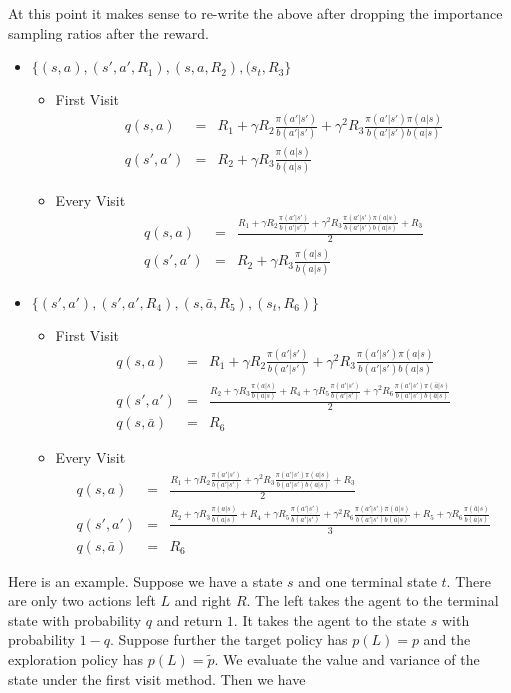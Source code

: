 \documentclass[11pt,a4paper]{article}
\newcommand\bea{\begin{eqnarray}}
\newcommand\eea{\end{eqnarray}}
\begin{document}
At this point it makes sense to re-write the above after dropping the importance sampling ratios after the reward.
 
\begin{itemize}
\item $\{(s,a),(s',a',R_1),(s,a,R_2),(s_t,R_3\}$ 
\begin{itemize}
\item First Visit
\bea
q(s,a) &=& R_1 + \gamma R_2 \frac{\pi(a'|s')}{b(a'|s')} +\gamma^2 R_3 \frac{\pi(a'|s') \pi(a|s)}{b(a'|s') b(a|s)} \\
q(s',a') &=& R_2 + \gamma R_3 \frac{\pi(a|s)}{b(a|s)}
\eea
\item Every Visit
\bea
q(s,a) &=& \frac{R_1 + \gamma R_2 \frac{\pi(a'|s')}{b(a'|s')} +\gamma^2 R_3 \frac{\pi(a'|s') \pi(a|s)}{b(a'|s') b(a|s)} +R_3}{2} \\
q(s',a') &=& R_2 + \gamma R_3 \frac{\pi(a|s)}{b(a|s)}
\eea
\end{itemize}
\item  $\{(s',a'),(s',a',R_4),(s,\bar a,R_5),(s_t,R_6)\}$
\begin{itemize}
\item First Visit
\bea
q(s,a) &=&R_1 + \gamma R_2 \frac{\pi(a'|s')}{b(a'|s')} +\gamma^2 R_3 \frac{\pi(a'|s') \pi(a|s)}{b(a'|s') b(a|s)} \\
q(s',a') &=& \frac{R_2 + \gamma R_3 \frac{\pi(a|s)}{b(a|s)} + R_4 + \gamma R_5 \frac{\pi(a'|s') }{b(a'|s') } + \gamma^2 R_6 \frac{\pi(a'|s') \pi(\bar a|s)}{b(a'|s') b(\bar a|s)}}{2} \\
q(s,\bar a) &=& R_6
\eea
\item Every Visit
\bea
q(s,a) &=&  \frac{R_1 + \gamma R_2 \frac{\pi(a'|s')}{b(a'|s')} +\gamma^2 R_3 \frac{\pi(a'|s') \pi(a|s)}{b(a'|s') b(a|s)} +R_3}{2} \\
q(s',a') &=& \frac{R_2 + \gamma R_3 \frac{\pi(a|s)}{b(a|s)} + R_4 + \gamma R_5 \frac{\pi(a'|s') }{b(a'|s') } + \gamma^2 R_6 \frac{\pi(a'|s') \pi(\bar a|s)}{b(a'|s') b(\bar a|s)} + R_5+ \gamma R_6 \frac{ \pi(\bar a|s)}{ b(\bar a|s)}}{3} \\
q(s,\bar a) &=& R_6
\eea
\end{itemize}
\end{itemize}


Here is an example. Suppose we have a state $s$ and one terminal state $t$. There are only two actions left $L$ and right $R$. The left takes the agent to the terminal state with probability $q$ and return $1$. It takes the agent to the state $s$ with probability $1-q$. Suppose further the target policy has $p(L)=p$ and the exploration policy has $p(L)=\tilde p$. We evaluate the value and variance of the state under the first visit method. Then we have
\end{document}
